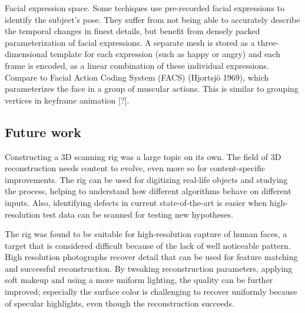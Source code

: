 Facial expression space. Some techiques \cite{faceshift,something} use pre-recorded facial expressions to identify the subject's pose.
They suffer from not being able to accurately describe the temporal changes in finest details, but benefit from densely packed parameterization of facial expressions.
A separate mesh is stored as a three-dimensional template for each expression (such as happy or angry) and each frame is encoded, as a linear combination of these individual expressions.
%
Compare to Facial Action Coding System (FACS) (Hjortsjö 1969), which parameterizes the face in a group of muscular actions. This is similar to grouping vertices in keyframe animation [?].
%
%

\subsection{Future work}




Constructing a 3D scanning rig was a large topic on its own.
The field of 3D reconstruction needs content to evolve, even more so for content-specific improvements.
The rig can be used for digitizing real-life objects and studying the process, helping to understand how different algorithms behave on different inputs.
Also, identifying defects in current state-of-the-art is easier when high-resolution test data can be scanned for testing new hypotheses.

The rig was found to be suitable for high-resolution capture of human faces, a target that is considered difficult because of the lack of well noticeable pattern.
High resolution photographs recover detail that can be used for feature matching and successful reconstruction.
By tweaking reconstruction parameters, applying soft makeup and using a more uniform lighting, the quality can be further improved;
especially the surface color is challenging to recover uniformly because of specular highlights, even though the reconstruction succeeds.


